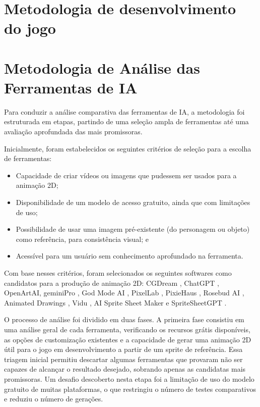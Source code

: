 \FloatBarrier
\section{Metodologia de desenvolvimento do jogo}
\label{s.jogo}

\FloatBarrier
\section{Metodologia de Análise das Ferramentas de IA}
\label{s.ia}


Para conduzir a análise comparativa das ferramentas de IA, a metodologia foi estruturada em etapas, partindo de uma seleção ampla de ferramentas até uma avaliação aprofundada das mais promissoras.

Inicialmente, foram estabelecidos os seguintes critérios de seleção para a escolha de ferramentas:

\begin{itemize}
\item Capacidade de criar vídeos ou imagens que pudessem ser usados para a animação 2D;
\item Disponibilidade de um modelo de acesso gratuito, ainda que com limitações de uso;
\item Possibilidade de usar uma imagem pré-existente (do personagem ou objeto) como referência, para consistência visual; e
\item Acessível para um usuário sem conhecimento aprofundado na ferramenta.
\end{itemize}

Com base nesses critérios, foram selecionados os seguintes softwares como candidatos para a produção de animação 2D: CGDream \cite{cgdream_2025}, ChatGPT \cite{chatgpt_2025}, OpenArtAI\cite{openArtai_2025}, geminiPro \cite{gemini_2025}, God Mode AI \cite{godmodeanimation2024}, PixelLab \cite{pixelLab}, PixieHaus \cite{pixie.haus_2025}, Rosebud AI \cite{rosebud}, Animated Drawings \cite{animatedDrawings}, Vidu \cite{viduai_2024}, AI Sprite Sheet Maker \cite{segmind} e SpriteSheetGPT \cite{spritesheetgpt-free}. 


O processo de análise foi dividido em duas fases. A primeira fase consistiu em uma análise geral de cada ferramenta, verificando os recursos grátis disponíveis, as opções de customização existentes e a capacidade de gerar uma animação 2D útil para o jogo em desenvolvimento a partir de um sprite de referência. Essa triagem inicial permitiu descartar algumas ferramentas que provaram não ser capazes de alcançar o resultado desejado, sobrando apenas as candidatas mais promissoras. Um desafio descoberto nesta etapa foi a limitação de uso do modelo gratuito de muitas plataformas, o que restringiu o número de testes comparativos e reduziu o número de gerações.

